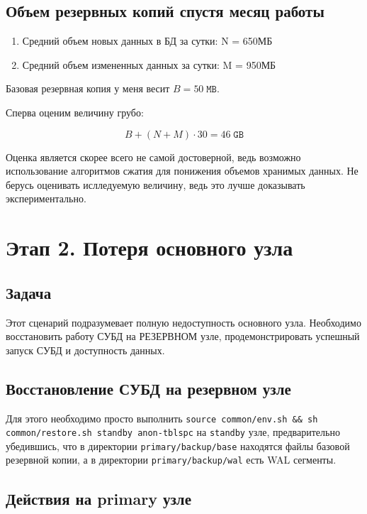 \documentclass{article}
\begin{document}
\subsection{Объем резервных копий спустя месяц работы}

\begin{enumerate}
    \item Средний объем новых данных в БД за сутки: N = 650МБ
    \item Средний объем измененных данных за сутки: M = 950МБ
\end{enumerate}

Базовая резервная копия у меня весит $B = 50 \; \texttt{MB}$. 

Сперва оценим величину грубо:

$$B + (N + M) \cdot 30 = 46 \; \texttt{GB} $$

Оценка является скорее всего не самой достоверной, ведь возможно использование алгоритмов сжатия для понижения объемов хранимых данных. Не берусь оценивать ислледуемую величину, ведь это лучше доказывать экспериментально.

\section{Этап 2. Потеря основного узла}

\subsection{Задача}

Этот сценарий подразумевает полную недоступность основного узла. Необходимо восстановить работу СУБД на РЕЗЕРВНОМ узле, продемонстрировать успешный запуск СУБД и доступность данных.

\subsection{Восстановление СУБД на резервном узле}

Для этого необходимо просто выполнить
\texttt{source common/env.sh \&\& sh common/restore.sh standby anon-tblspc}
на \texttt{standby} узле, предварительно убедившись, что в
директории \texttt{primary/backup/base} находятся файлы базовой резервной копии,
а в директории \texttt{primary/backup/wal} есть WAL сегменты.



\subsection{Действия на primary узле}
\end{document}
